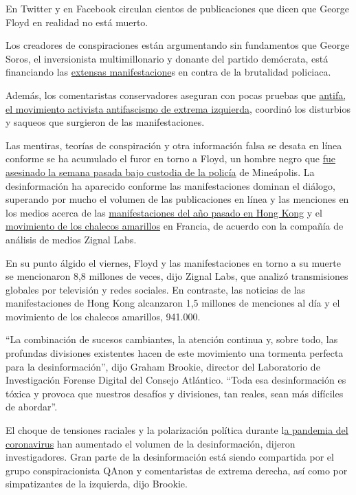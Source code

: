 En Twitter y en Facebook circulan cientos de publicaciones que dicen que
George Floyd en realidad no está muerto.

Los creadores de conspiraciones están argumentando sin fundamentos que
George Soros, el inversionista multimillonario y donante del partido
demócrata, está financiando las
\href{https://www.nytimes3xbfgragh.onion/live/2020/george-floyd-protests-today-06-01}{extensas
manifestacione}s en contra de la brutalidad policiaca.

Además, los comentaristas conservadores aseguran con pocas pruebas que
\href{https://www.nytimes3xbfgragh.onion/es/2020/06/02/espanol/mundo/que-es-antifa.html}{antifa,
el movimiento activista antifascismo de extrema izquierda}, coordinó los
disturbios y saqueos que surgieron de las manifestaciones.

Las mentiras, teorías de conspiración y otra información falsa se desata
en línea conforme se ha acumulado el furor en torno a Floyd, un hombre
negro que
\href{https://www.nytimes3xbfgragh.onion/2020/05/31/us/george-floyd-investigation.html}{fue
asesinado la semana pasada bajo custodia de la policía} de Mineápolis.
La desinformación ha aparecido conforme las manifestaciones dominan el
diálogo, superando por mucho el volumen de las publicaciones en línea y
las menciones en los medios acerca de las
\href{https://www.nytimes3xbfgragh.onion/news-event/hong-kong-protests}{manifestaciones
del año pasado en Hong Kong} y el
\href{https://www.nytimes3xbfgragh.onion/2019/04/15/business/yellow-vests-movement-inequality.html}{movimiento
de los chalecos amarillos} en Francia, de acuerdo con la compañía de
análisis de medios Zignal Labs.

En su punto álgido el viernes, Floyd y las manifestaciones en torno a su
muerte se mencionaron 8,8 millones de veces, dijo Zignal Labs, que
analizó transmisiones globales por televisión y redes sociales. En
contraste, las noticias de las manifestaciones de Hong Kong alcanzaron
1,5 millones de menciones al día y el movimiento de los chalecos
amarillos, 941.000.

``La combinación de sucesos cambiantes, la atención continua y, sobre
todo, las profundas divisiones existentes hacen de este movimiento una
tormenta perfecta para la desinformación'', dijo Graham Brookie,
director del Laboratorio de Investigación Forense Digital del Consejo
Atlántico. ``Toda esa desinformación es tóxica y provoca que nuestros
desafíos y divisiones, tan reales, sean más difíciles de abordar''.

El choque de tensiones raciales y la polarización política durante
l\href{https://www.nytimes3xbfgragh.onion/news-event/coronavirus?action=click\&pgtype=Article\&state=default\&module=styln-coronavirus\&variant=show\&region=TOP_BANNER\&context=storylines_menu}{a
pandemia del coronavirus} han aumentado el volumen de la desinformación,
dijeron investigadores. Gran parte de la desinformación está siendo
compartida por el grupo conspiracionista QAnon y comentaristas de
extrema derecha, así como por simpatizantes de la izquierda, dijo
Brookie.

